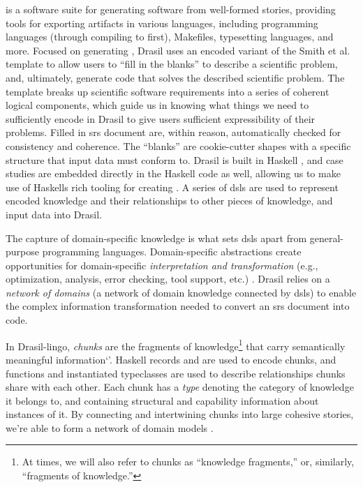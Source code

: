  is a software suite
for generating software from well-formed stories, providing tools for exporting
artifacts in various languages, including programming languages (through
compiling to  \cite{Carette2019} first), Makefiles, typesetting
languages, and more. Focused on generating , Drasil uses an encoded
variant of the Smith et al. \cite{SmithAndLai2005}  template to allow
users to ``fill in the blanks'' to describe a scientific problem, and,
ultimately, generate code that solves the described scientific problem. The
template breaks up scientific software requirements into a series of coherent
logical components, which guide us in knowing what things we need to
sufficiently encode in Drasil to give users sufficient expressibility of their
problems. Filled in \acs{srs} document are, within reason, automatically checked
for consistency and coherence. The ``blanks'' are cookie-cutter shapes with a
specific structure that input data must conform to. Drasil is built in Haskell
\cite{Haskell2010}, and case studies are embedded directly in the Haskell code
as well, allowing us to make use of Haskells rich tooling for creating
. A series of \acsp{dsl} are used to represent encoded knowledge and
their relationships to other pieces of knowledge, and input data into Drasil.

The capture of domain-specific knowledge is what sets \acsp{dsl} apart from
general-purpose programming languages. Domain-specific abstractions create
opportunities for domain-specific \textit{interpretation and transformation}
(e.g., optimization, analysis, error checking, tool support, etc.)
\cite{Czarnecki2005}. Drasil relies on a \textit{network of domains} (a network
of domain knowledge connected by \aclp{dsl}) to enable the complex information
transformation needed to convert an \acs{srs} document into code. 

In Drasil-lingo, \textit{chunks} are the fragments of knowledge\footnote{At
times, we will also refer to chunks as ``knowledge fragments,'' or, similarly,
``fragments of knowledge.''} that carry semantically meaningful information`'.
Haskell records and  are used to encode chunks, and functions and
instantiated typeclasses are used to describe relationships chunks share with
each other. Each chunk has a \textit{type} denoting the category of knowledge it
belongs to, and containing structural and capability information about instances
of it. By connecting and intertwining chunks into large cohesive stories, we're
able to form a network of domain models \cite{Czarnecki2005}.

